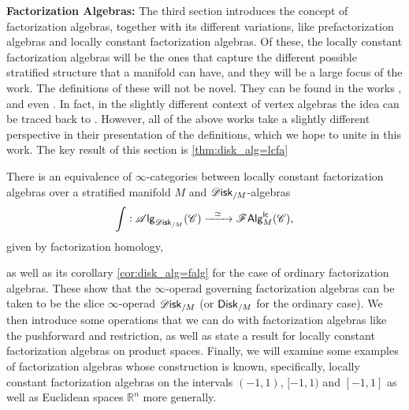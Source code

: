 \documentclass[../text]{subfiles}
\begin{document}
\textbf{ Factorization Algebras:} The third section introduces the concept of factorization algebras, together with its different variations, like prefactorization algebras and locally constant factorization algebras. Of these, the locally constant factorization algebras will be the ones that capture the different possible stratified structure that a manifold can have, and they will be a large focus of the work. The definitions of these will not be novel. They can be found in the works \cite{cg2016}, \cite{ginot2015} and even \cite{af_primer}. In fact, in the slightly different context of vertex algebras the idea can be traced back to \cite{bd2004}. However, all of the above works take a slightly different perspective in their presentation of the definitions, which we hope to unite in this work. The key result of this section is \cref{thm:disk_alg=lcfa}
%
\begin{theorem}
    There is an equivalence of $\infty$-categories between locally constant factorization algebras over a stratified manifold $M$ and $\disk_{/M}$-algebras
    \begin{equation}
        \int: \alg{\disk_{/M}} (\catC) \xrightarrow{\ \ \simeq \ \ } \lcfa_M (\catC),
    \end{equation}
    given by factorization homology,
\end{theorem}
%
as well as its corollary \cref{cor:disk_alg=falg} for the case of ordinary factorization algebras. These show that the $\infty$-operad governing factorization algebras can be taken to be the slice $\infty$-operad $\disk_{/M}$ (or $\disk[r]_{/M}$ for the ordinary case). We then introduce some operations that we can do with factorization algebras like the pushforward and restriction, as well as state a result for locally constant factorization algebras on product spaces. Finally, we will examine some examples of factorization algebras whose construction is known, specifically, locally constant factorization algebras on the intervals $(-1,1)$, $[-1,1)$ and $[-1,1]$ as well as Euclidean spaces $\mathbb{R}^n$ more generally.
\end{document}
